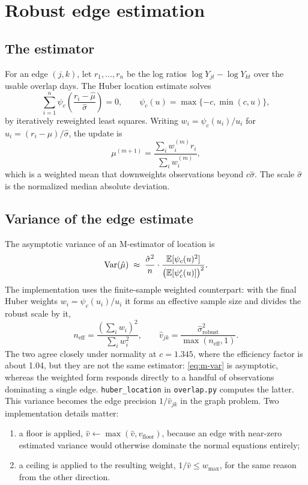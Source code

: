 \documentclass[12pt,a4paper,oneside]{article}
\begin{document}
\section{Robust edge estimation}

\subsection{The estimator}

For an edge $(j,k)$, let $r_1,\dots,r_n$ be the log ratios
$\log Y_{jt}-\log Y_{kt}$ over the usable overlap days. The Huber location
estimate solves
\begin{equation}
\sum_{i=1}^{n}\psi_c\!\left(\frac{r_i-\hat{\mu}}{\hat{\sigma}}\right)=0,
\qquad
\psi_c(u)=\max\{-c,\min(c,u)\},
\end{equation}
by iteratively reweighted least squares. Writing
$w_i=\psi_c(u_i)/u_i$ for $u_i=(r_i-\mu)/\hat{\sigma}$, the update is
\begin{equation}
\mu^{(m+1)}=\frac{\sum_i w_i^{(m)} r_i}{\sum_i w_i^{(m)}},
\end{equation}
which is a weighted mean that downweights observations beyond $c\hat\sigma$.
The scale $\hat{\sigma}$ is the normalized median absolute deviation.

\subsection{Variance of the edge estimate}

The asymptotic variance of an M-estimator of location is
\begin{equation}
\operatorname{Var}(\hat{\mu}) \;\approx\;
\frac{\hat{\sigma}^2}{n}\cdot
\frac{\mathbb{E}[\psi_c(u)^2]}{\big(\mathbb{E}[\psi_c'(u)]\big)^2}.
\label{eq:m-var}
\end{equation}
The implementation uses the finite-sample weighted counterpart: with the final
Huber weights $w_i=\psi_c(u_i)/u_i$ it forms an effective sample size and divides
the robust scale by it,
\begin{equation}
n_{\text{eff}}=\frac{\left(\sum_i w_i\right)^2}{\sum_i w_i^2},
\qquad
\hat{v}_{jk}=\frac{\hat{\sigma}^2_{\text{robust}}}{\max(n_{\text{eff}},1)}.
\end{equation}
The two agree closely under normality at $c=1.345$, where the efficiency factor
is about 1.04, but they are not the same estimator: \eqref{eq:m-var} is
asymptotic, whereas the weighted form responds directly to a handful of
observations dominating a single edge. \texttt{huber\_location} in
\texttt{overlap.py} computes the latter.
This variance becomes the edge precision $1/\hat{v}_{jk}$ in the graph problem.
Two implementation details matter:
\begin{enumerate}
\item a floor is applied, $\hat{v}\leftarrow\max(\hat{v},v_{\text{floor}})$,
because an edge with near-zero estimated variance would otherwise dominate the
normal equations entirely;
\item a ceiling is applied to the resulting weight, $1/\hat{v}\le w_{\max}$,
for the same reason from the other direction.
\end{enumerate}
\end{document}
